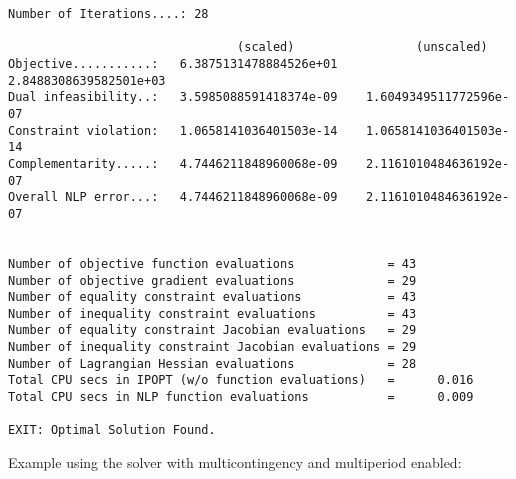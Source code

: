 \begin{lstlisting}
Number of Iterations....: 28

                                (scaled)                 (unscaled)
Objective...........:   6.3875131478884526e+01    2.8488308639582501e+03
Dual infeasibility..:   3.5985088591418374e-09    1.6049349511772596e-07
Constraint violation:   1.0658141036401503e-14    1.0658141036401503e-14
Complementarity.....:   4.7446211848960068e-09    2.1161010484636192e-07
Overall NLP error...:   4.7446211848960068e-09    2.1161010484636192e-07


Number of objective function evaluations             = 43
Number of objective gradient evaluations             = 29
Number of equality constraint evaluations            = 43
Number of inequality constraint evaluations          = 43
Number of equality constraint Jacobian evaluations   = 29
Number of inequality constraint Jacobian evaluations = 29
Number of Lagrangian Hessian evaluations             = 28
Total CPU secs in IPOPT (w/o function evaluations)   =      0.016
Total CPU secs in NLP function evaluations           =      0.009

EXIT: Optimal Solution Found.
\end{lstlisting}

Example using the \ipopt solver with multicontingency and multiperiod enabled:

